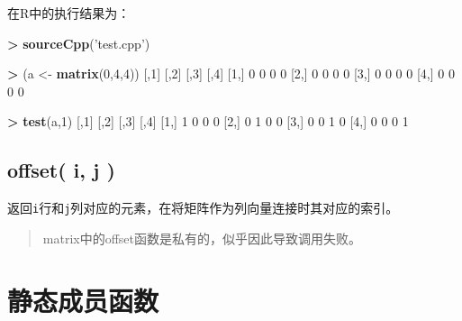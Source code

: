 \documentclass[]{ctexbook}
\newenvironment{Shaded}{\begin{snugshade}}{\end{snugshade}}
\newcommand{\KeywordTok}[1]{\textcolor[rgb]{0.13,0.29,0.53}{\textbf{#1}}}
\newcommand{\DecValTok}[1]{\textcolor[rgb]{0.00,0.00,0.81}{#1}}
\newcommand{\StringTok}[1]{\textcolor[rgb]{0.31,0.60,0.02}{#1}}
\newcommand{\OperatorTok}[1]{\textcolor[rgb]{0.81,0.36,0.00}{\textbf{#1}}}
\newcommand{\NormalTok}[1]{#1}
\begin{document}
在R中的执行结果为：

\begin{Shaded}
\begin{Highlighting}[]
\OperatorTok{>}\StringTok{ }\KeywordTok{sourceCpp}\NormalTok{(}\StringTok{'test.cpp'}\NormalTok{)}

\OperatorTok{>}\StringTok{ }\NormalTok{(a <-}\StringTok{ }\KeywordTok{matrix}\NormalTok{(}\DecValTok{0}\NormalTok{,}\DecValTok{4}\NormalTok{,}\DecValTok{4}\NormalTok{))}
\NormalTok{     [,}\DecValTok{1}\NormalTok{] [,}\DecValTok{2}\NormalTok{] [,}\DecValTok{3}\NormalTok{] [,}\DecValTok{4}\NormalTok{]}
\NormalTok{[}\DecValTok{1}\NormalTok{,]    }\DecValTok{0}    \DecValTok{0}    \DecValTok{0}    \DecValTok{0}
\NormalTok{[}\DecValTok{2}\NormalTok{,]    }\DecValTok{0}    \DecValTok{0}    \DecValTok{0}    \DecValTok{0}
\NormalTok{[}\DecValTok{3}\NormalTok{,]    }\DecValTok{0}    \DecValTok{0}    \DecValTok{0}    \DecValTok{0}
\NormalTok{[}\DecValTok{4}\NormalTok{,]    }\DecValTok{0}    \DecValTok{0}    \DecValTok{0}    \DecValTok{0}

\OperatorTok{>}\StringTok{ }\KeywordTok{test}\NormalTok{(a,}\DecValTok{1}\NormalTok{)}
\NormalTok{     [,}\DecValTok{1}\NormalTok{] [,}\DecValTok{2}\NormalTok{] [,}\DecValTok{3}\NormalTok{] [,}\DecValTok{4}\NormalTok{]}
\NormalTok{[}\DecValTok{1}\NormalTok{,]    }\DecValTok{1}    \DecValTok{0}    \DecValTok{0}    \DecValTok{0}
\NormalTok{[}\DecValTok{2}\NormalTok{,]    }\DecValTok{0}    \DecValTok{1}    \DecValTok{0}    \DecValTok{0}
\NormalTok{[}\DecValTok{3}\NormalTok{,]    }\DecValTok{0}    \DecValTok{0}    \DecValTok{1}    \DecValTok{0}
\NormalTok{[}\DecValTok{4}\NormalTok{,]    }\DecValTok{0}    \DecValTok{0}    \DecValTok{0}    \DecValTok{1}
\end{Highlighting}
\end{Shaded}

\subsection{offset( i, j )}\label{offsetij}

返回\texttt{i}行和\texttt{j}列对应的元素，在将矩阵作为列向量连接时其对应的索引。

\begin{quote}
matrix中的offset函数是私有的，似乎因此导致调用失败。
\end{quote}

\section{静态成员函数}\label{MStatic-member-functions}
\end{document}
